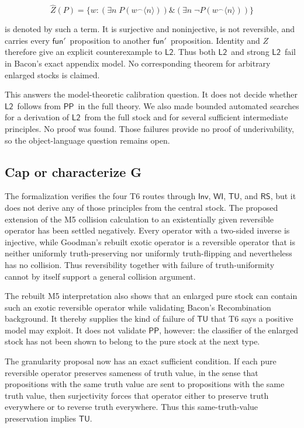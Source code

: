 \documentclass[12pt,leqno]{article}
\newcommand{\AND}{\ensuremath{\mathbin{\&}}}
\theoremstyle{plain}
\theoremstyle{definition}
\newcommand{\funp}{\ensuremath{\mathsf{fun}'\,}}
\newcommand{\PP}{\ensuremath{\mathsf{PP}}}
\newcommand{\Ltwo}{\ensuremath{\mathsf{L2}}}
\newcommand{\TU}{\ensuremath{\mathsf{TU}}}
\newcommand{\WI}{\ensuremath{\mathsf{WI}}}
\newcommand{\Inv}{\ensuremath{\mathsf{Inv}}}
\newcommand{\RS}{\ensuremath{\mathsf{RS}}}
\begin{document}
\[
 \widehat Z(P)=
 \{w:(\exists n\;P(w^\frown\langle n\rangle))
       \AND(\exists n\;\neg P(w^\frown\langle n\rangle))\}
\]

is denoted by such a term.  It is surjective and noninjective, is not
reversible, and carries every \(\funp\) proposition to another \(\funp\)
proposition.  Identity and \(Z\) therefore give an explicit counterexample
to \Ltwo.  Thus both \Ltwo\ and strong \Ltwo\ fail in Bacon's exact appendix
model.  No corresponding theorem for arbitrary enlarged stocks is claimed.

This answers the model-theoretic calibration question.  It does not decide
whether \Ltwo\ follows from \PP\ in the full theory.  We also made bounded
automated searches for a derivation of \Ltwo\ from the full stock and for
several sufficient intermediate principles.  No proof was found.  Those
failures provide no proof of underivability, so the object-language question
remains open.

\subsection{Cap or characterize G}

The formalization verifies the four T6 routes through \Inv, \WI, \TU, and
\RS, but it does not derive any of those principles from the central stock.
The proposed extension of the M5 collision calculation to an existentially
given reversible operator has been settled negatively.  Every operator with
a two-sided inverse is injective, while Goodman's rebuilt exotic operator is
a reversible operator that is neither uniformly truth-preserving nor
uniformly truth-flipping and nevertheless has no collision.  Thus
reversibility together with failure of truth-uniformity cannot by itself
support a general collision argument.

The rebuilt M5 interpretation also shows that an enlarged pure stock can
contain such an exotic reversible operator while validating Bacon's
Recombination background.  It thereby supplies the kind of failure of \TU{}
that T6 says a positive model may exploit.  It does not validate \PP,
however: the classifier of the enlarged stock has not been shown to belong
to the pure stock at the next type.

The granularity proposal now has an exact sufficient condition.  If each pure
reversible operator preserves sameness of truth value, in the sense that
propositions with the same truth value are sent to propositions with the same
truth value, then surjectivity
forces that operator either to preserve truth everywhere or to reverse truth
everywhere.  Thus this same-truth-value preservation implies \TU.
\end{document}
